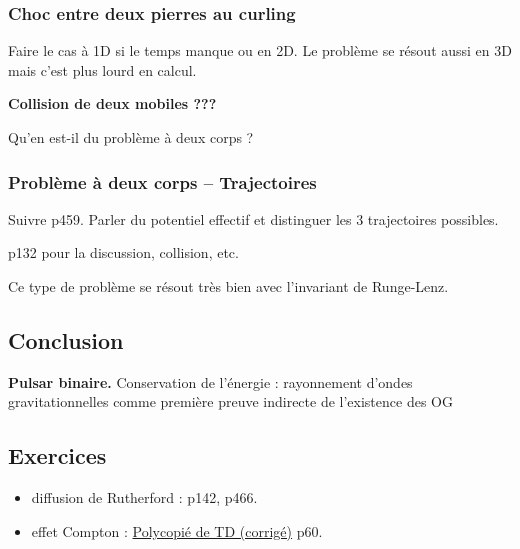 \subsubsection{Choc entre deux pierres au curling}

Faire le cas à 1D si le temps manque ou en 2D.
Le problème se résout aussi en 3D mais c'est plus lourd en calcul.

\begin{experience}
\textbf{Collision de deux mobiles ???}
\end{experience}

\begin{transition}
Qu'en est-il du problème à deux corps ?
\end{transition}

\subsubsection{Problème à deux corps -- Trajectoires}

Suivre \cite{Michel2017} p459.
Parler du potentiel effectif et distinguer les 3 trajectoires possibles.

\cite{Faroux1996} p132 pour la discussion, collision, etc.

\begin{remarque}
Ce type de problème se résout très bien avec l'invariant de Runge-Lenz.
\end{remarque}

\subsection*{Conclusion}

\begin{slide}
\textbf{Pulsar binaire.}
Conservation de l'énergie : rayonnement d'ondes gravitationnelles comme première preuve indirecte de l'existence des OG
\end{slide}



\subsection*{Exercices}

\begin{itemize}
\item diffusion de Rutherford : \cite{Faroux1996} p142, \cite{Michel2017} p466.
\item effet Compton : \href{http://supernovae.in2p3.fr/~llg/Enseignements/Agregation/Relativite/}{Polycopié de TD (corrigé)} p60.
\end{itemize}

\newpage